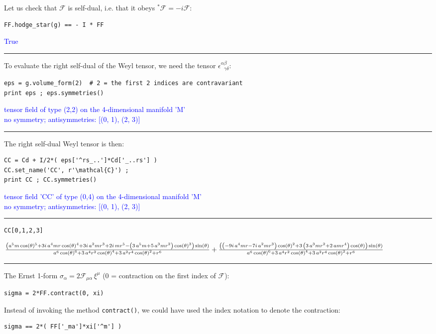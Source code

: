 \documentclass[a4paper]{jpconf}
\newcommand{\code}[1]{\texttt{#1}}
\newcommand{\w}[1]{\bm{#1}}
\newcommand{\soutput}[1]{\textcolor{blue}{#1}\\[-0.8ex]\rule{\textwidth}{0.4pt}}
\begin{document}
Let us check that $\w{\mathcal{F}}$ is self-dual, i.e. that it obeys
${}^* \w{\mathcal{F}} = -i \w{\mathcal{F}}$:
\begin{verbatim}
FF.hodge_star(g) == - I * FF
\end{verbatim}
\soutput{True}
To evaluate the right self-dual of the Weyl tensor, we need the 
tensor $\epsilon^{\alpha\beta}_{\ \ \ \gamma\delta}$:
\begin{verbatim}
eps = g.volume_form(2)  # 2 = the first 2 indices are contravariant
print eps ; eps.symmetries()
\end{verbatim}
\soutput{tensor field of type (2,2) on the 4-dimensional manifold 'M'\\
no symmetry;  antisymmetries: [(0, 1), (2, 3)]}
The right self-dual Weyl tensor is then:
\begin{verbatim}
CC = Cd + I/2*( eps['^rs_..']*Cd['_..rs'] )
CC.set_name('CC', r'\mathcal{C}') ; 
print CC ; CC.symmetries()
\end{verbatim}
\soutput{tensor field 'CC' of type (0,4) on the 4-dimensional manifold 'M'\\
no symmetry;  antisymmetries: [(0, 1), (2, 3)]}
\begin{verbatim}
CC[0,1,2,3]
\end{verbatim}
\soutput{$\frac{{\left(a^{5} m \cos\left(\theta\right)^{5} + 3 i \, a^{4} m r
\cos\left(\theta\right)^{4} + 3 i \, a^{2} m r^{3} + 2 i \, m r^{5} -
{\left(3 \, a^{5} m + 5 \, a^{3} m r^{2}\right)}
\cos\left(\theta\right)^{3}\right)}
\sin\left(\theta\right)}
{a^{6} \cos\left(\theta\right)^{6} + 3 \, a^{4}
r^{2} \cos\left(\theta\right)^{4} + 3 \, a^{2} r^{4}
\cos\left(\theta\right)^{2} + r^{6}}\\
+\frac{{\left({\left(-9 i \, a^{4} m r - 7 i \, a^{2} m
r^{3}\right)} \cos\left(\theta\right)^{2} + 3 \, {\left(3 \, a^{3} m
r^{2} + 2 \, a m r^{4}\right)} \cos\left(\theta\right)\right)}
\sin\left(\theta\right)}
{a^{6} \cos\left(\theta\right)^{6} + 3 \, a^{4}
r^{2} \cos\left(\theta\right)^{4} + 3 \, a^{2} r^{4}
\cos\left(\theta\right)^{2} + r^{6}}$}
The Ernst 1-form $\sigma_\alpha = 2 \mathcal{F}_{\mu\alpha} \, \xi^\mu$ (0 = contraction on the first index of $\w{\mathcal{F}}$):
\begin{verbatim}
sigma = 2*FF.contract(0, xi)
\end{verbatim}
Instead of invoking the method \code{contract()}, 
we could have used the index notation to denote the contraction:
\begin{verbatim}
sigma == 2*( FF['_ma']*xi['^m'] )
\end{verbatim}
\end{document}
